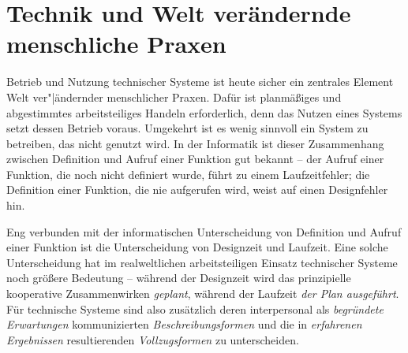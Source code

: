 \documentclass[11pt,a4paper]{article}
\begin{document}
\section{Technik und Welt verändernde menschliche Praxen}

Betrieb und Nutzung technischer Systeme ist heute sicher ein zentrales Element
Welt ver"|ändernder menschlicher Praxen. Dafür ist planmäßiges und abgestimmtes
arbeitsteiliges Handeln erforderlich, denn das Nutzen eines Systems setzt
dessen Betrieb voraus.  Umgekehrt ist es wenig sinnvoll ein System zu
betreiben, das nicht genutzt wird. In der Informatik ist dieser Zusammenhang
zwischen Definition und Aufruf einer Funktion gut bekannt -- der Aufruf einer
Funktion, die noch nicht definiert wurde, führt zu einem Laufzeitfehler; die
Definition einer Funktion, die nie aufgerufen wird, weist auf einen
Designfehler hin.

Eng verbunden mit der informatischen Unterscheidung von Definition und Aufruf
einer Funktion ist die Unterscheidung von Designzeit und Laufzeit.  Eine
solche Unterscheidung hat im realweltlichen arbeitsteiligen Einsatz
technischer Systeme noch größere Bedeutung -- während der Designzeit wird das
prinzipielle kooperative Zusammenwirken \emph{geplant}, während der Laufzeit
\emph{der Plan ausgeführt}. Für technische Systeme sind also zusätzlich deren
interpersonal als \emph{begründete Erwartungen} kommunizierten
\emph{Beschreibungsformen} und die in \emph{erfahrenen Ergebnissen}
resultierenden \emph{Vollzugsformen} zu unterscheiden.
\end{document}
